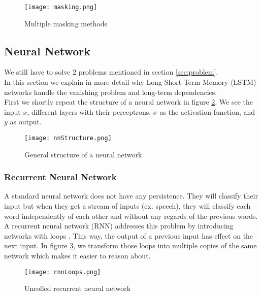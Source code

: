 \begin{figure}[!htb]
	\centering
	\texttt{[image: masking.png]}
	\caption{Multiple masking methods \cite{dl4jRnn:online}}
	\label{fig:masking}
\end{figure} 


\subsection{Neural Network}
\label{sec:nn}

We still have to solve $2$ problems mentioned in section \ref{sec:problem}. \\
In this section we explain in more detail why Long-Short Term Memory (LSTM) \cite{lstmOrginin:article} networks handle the vanishing problem and long-term dependencies. \\

First we shortly repeat the structure of a neural network in figure \ref{fig:nnStructure}. We see the input $x$, different layers with their perceptrons, $\sigma$ as the activation function, and $y$ as output. 

\begin{figure}[!htb]
	\centering
	\texttt{[image: nnStructure.png]}
	\caption{General structure of a neural network \cite{IMECJaak}}
	\label{fig:nnStructure}
\end{figure} 

\subsubsection{Recurrent Neural Network}
\label{sec:rnn}

A standard neural network does not have any persistence. They will classify their input but when they get a stream of inputs (ex. speech), they will classify each word independently of each other and without any regards of the previous words. A recurrent neural network (RNN) addresses this problem by introducing networks with loops \cite{rnnOrigin:article}. This way, the output of a previous input has effect on the next input. In figure \ref{fig:rnnLoops}, we transform those loops into multiple copies of the same network which makes it easier to reason about. \\

\begin{figure}[!htb]
	\centering
	\texttt{[image: rnnLoops.png]}
	\caption{Unrolled recurrent neural network \cite{IMECJaak}}
	\label{fig:rnnLoops}
\end{figure} 

